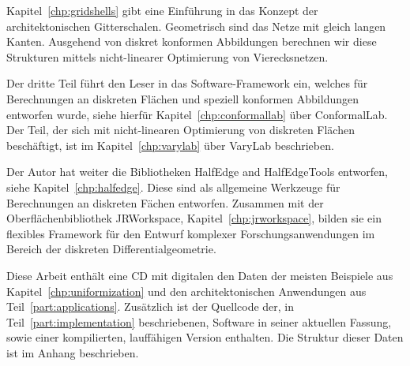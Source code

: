 \documentclass[Thesis.tex]{subfiles}
\begin{document}
Kapitel~\ref{chp:gridshells} gibt eine Einf\"{u}hrung in das Konzept der architektonischen Gitterschalen.
Geometrisch sind das Netze mit gleich langen Kanten.
Ausgehend von diskret konformen Abbildungen berechnen wir diese Strukturen mittels nicht-linearer Optimierung von Vierecksnetzen.

Der dritte Teil f\"{u}hrt den Leser in das Software-Framework ein, welches f\"{u}r Berechnungen an diskreten Fl\"{a}chen und speziell konformen Abbildungen entworfen wurde, siehe hierf\"{u}r Kapitel~\ref{chp:conformallab} \"{u}ber {\sc ConformalLab}.
Der Teil, der sich mit nicht-linearen Optimierung von diskreten Fl\"{a}chen besch\"{a}ftigt, ist im Kapitel~\ref{chp:varylab} \"{u}ber {\sc VaryLab} beschrieben.

Der Autor hat weiter die Bibliotheken {\sc HalfEdge} and {\sc HalfEdgeTools} entworfen, siehe Kapitel~\ref{chp:halfedge}.
Diese sind als allgemeine Werkzeuge f\"ur Berechnungen an diskreten F\"{a}chen entworfen.
Zusammen mit der Oberfl\"{a}chenbibliothek {\sc JRWorkspace}, Kapitel~\ref{chp:jrworkspace}, bilden sie ein flexibles Framework f\"{u}r den Entwurf komplexer Forschungsanwendungen im Bereich der diskreten Differentialgeometrie.

Diese Arbeit enth\"{a}lt eine CD mit digitalen den Daten der meisten Beispiele aus Kapitel~\ref{chp:uniformization} und den architektonischen Anwendungen aus Teil~\ref{part:applications}.
Zus\"{a}tzlich ist der Quellcode der, in Teil~\ref{part:implementation} beschriebenen, Software in seiner aktuellen Fassung, sowie einer kompilierten, lauff\"{a}higen Version enthalten.
Die Struktur dieser Daten ist im Anhang beschrieben.

\subfilebibliography
\end{document}
